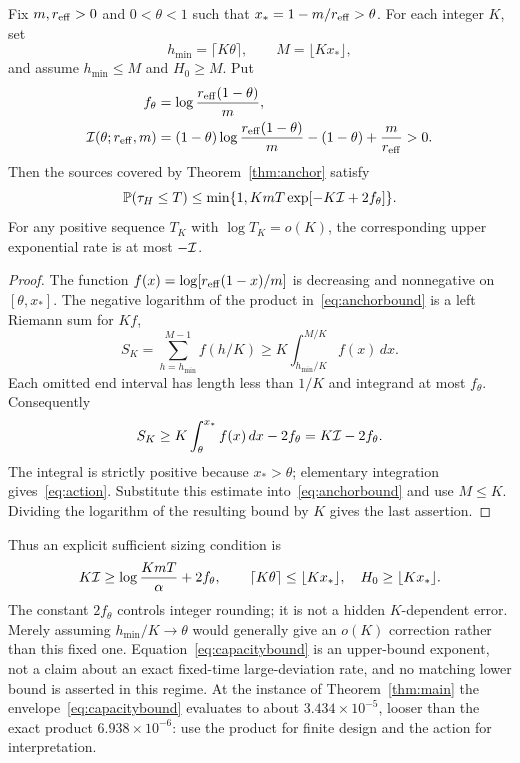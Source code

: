 \begin{theorem}\label{thm:capacity}
Fix $m,r_{\mathrm{eff}}>0$ and $0<\theta<1$ such that $x_*=1-m/r_{\mathrm{eff}}>\theta$. For each integer $K$, set
\[
 h_{\min}=\lceil K\theta\rceil,\qquad M=\lfloor Kx_*\rfloor,
\]
and assume $h_{\min}\le M$ and $H_0\ge M$. Put
\begin{align}\label{eq:action}
 f_\theta&=\log\frac{r_{\mathrm{eff}}(1-\theta)}m,\nonumber\\
 \mathcal I(\theta;r_{\mathrm{eff}},m)
 &=(1-\theta)\log\frac{r_{\mathrm{eff}}(1-\theta)}m-(1-\theta)+\frac m{r_{\mathrm{eff}}}>0.
\end{align}
Then the sources covered by Theorem~\ref{thm:anchor} satisfy
\begin{equation}\label{eq:capacitybound}
 \mathbb P(\tau_H\le T)
 \le\min\{1,KmT\exp[-K\mathcal I+2f_\theta]\}.
\end{equation}
For any positive sequence $T_K$ with $\log T_K=o(K)$, the corresponding upper exponential rate is at most $-\mathcal I$.
\end{theorem}
\begin{proof}
The function $f(x)=\log[r_{\mathrm{eff}}(1-x)/m]$ is decreasing and nonnegative on $[\theta,x_*]$. The negative logarithm of the product in~\eqref{eq:anchorbound} is a left Riemann sum for $Kf$,
\[
 S_K=\sum_{h=h_{\min}}^{M-1}f(h/K)
 \ge K\int_{h_{\min}/K}^{M/K}f(x)\,dx.
\]
Each omitted end interval has length less than $1/K$ and integrand at most $f_\theta$. Consequently
\[
 S_K\ge K\int_\theta^{x_*}f(x)\,dx-2f_\theta=K\mathcal I-2f_\theta.
\]
The integral is strictly positive because $x_*>\theta$; elementary integration gives~\eqref{eq:action}. Substitute this estimate into~\eqref{eq:anchorbound} and use $M\le K$. Dividing the logarithm of the resulting bound by $K$ gives the last assertion.
\end{proof}

Thus an explicit sufficient sizing condition is
\begin{equation}\label{eq:sizing}
 K\mathcal I\ge\log\frac{KmT}{\alpha}+2f_\theta,\qquad
 \lceil K\theta\rceil\le\lfloor Kx_*\rfloor,\quad H_0\ge\lfloor Kx_*\rfloor.
\end{equation}
The constant $2f_\theta$ controls integer rounding; it is not a hidden $K$-dependent error. Merely assuming $h_{\min}/K\to\theta$ would generally give an $o(K)$ correction rather than this fixed one. Equation~\eqref{eq:capacitybound} is an upper-bound exponent, not a claim about an exact fixed-time large-deviation rate, and no matching lower bound is asserted in this regime. At the instance of Theorem~\ref{thm:main} the envelope~\eqref{eq:capacitybound} evaluates to about $3.434\times10^{-5}$, looser than the exact product $6.938\times10^{-6}$: use the product for finite design and the action for interpretation.
